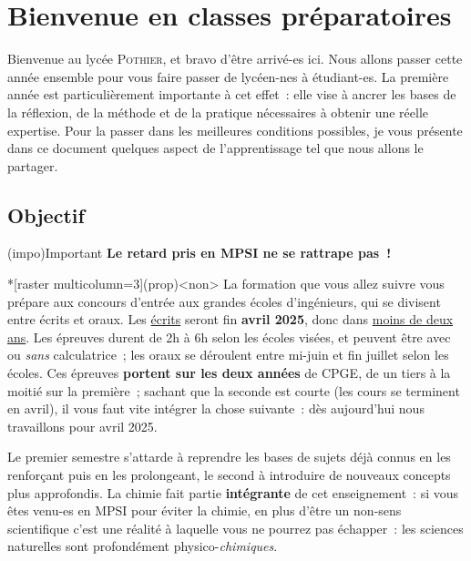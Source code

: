 \documentclass[10pt, garamond]{book}
\begin{document}
\chapter*{Bienvenue en classes pr\'eparatoires}

Bienvenue au lycée \textsc{Pothier}, et bravo d'être arrivé-es ici. Nous allons
passer cette année ensemble pour vous faire passer de lycéen-nes à étudiant-es.
La première année est particulièrement importante à cet effet~: elle vise à
ancrer les bases de la réflexion, de la méthode et de la pratique nécessaires à
obtenir une réelle expertise. Pour la passer dans les meilleures conditions
possibles, je vous présente dans ce document quelques aspect de l'apprentissage
tel que nous allons le partager.

\section{Objectif}

\begin{tcbraster}[raster columns=4, raster equal height=rows]
	\begin{tcb}[width=.5\linewidth, cnt](impo){Important}
		\textbf{Le retard pris en MPSI ne se rattrape pas~!}
	\end{tcb}
	\begin{tcb}*[raster multicolumn=3](prop)<non>{}
		La formation que vous allez suivre vous prépare aux concours d'entrée
		aux grandes écoles d'ingénieurs, qui se divisent entre écrits et oraux.
		Les \underline{écrits} seront fin \textbf{avril 2025}, donc dans
		\underline{moins de deux ans}. Les épreuves durent de 2h à 6h selon les
		écoles visées, et peuvent être avec ou \textit{sans} calculatrice~; les
		oraux se déroulent entre mi-juin et fin juillet selon les écoles. Ces
		épreuves \textbf{portent sur les deux années} de CPGE, de un tiers à la
		moitié sur la première~; sachant que la seconde est courte (les cours se
		terminent en avril), il vous faut vite intégrer la chose suivante~: dès
		aujourd'hui nous travaillons pour avril 2025.
	\end{tcb}
\end{tcbraster}

Le premier semestre s'attarde à reprendre les bases de sujets déjà connus en les
renforçant puis en les prolongeant, le second à introduire de nouveaux concepts
plus approfondis. La chimie fait partie \textbf{intégrante} de cet
enseignement~: si vous êtes venu-es en MPSI pour éviter la chimie, en plus
d'être un non-sens scientifique c'est une réalité à laquelle vous ne pourrez pas
échapper~: les sciences naturelles sont profondément physico-\textit{chimiques}.
\end{document}
